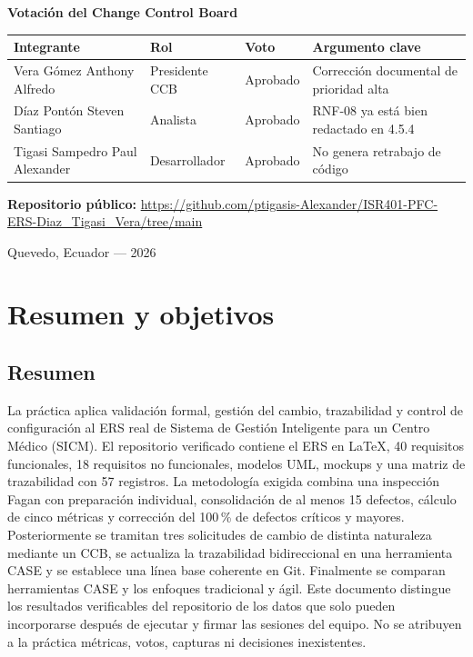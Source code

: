 \documentclass[11pt,a4paper]{article}
\newcommand{\sistema}{Sistema de Gestión Inteligente para un Centro Médico (SICM)}
\begin{document}
\begin{titlepage}
		\vspace{0.8cm}
		{\large\bfseries Votación del Change Control Board\par}
		\vspace{0.25cm}
		\begin{tabularx}{\textwidth}{p{4.2cm}p{3.2cm}p{2.0cm}X}
			\toprule
			\textbf{Integrante} & \textbf{Rol} & \textbf{Voto} & \textbf{Argumento clave} \\
			\midrule
			Vera Gómez Anthony Alfredo & Presidente CCB & Aprobado & Corrección documental de prioridad alta \\
			Díaz Pontón Steven Santiago & Analista & Aprobado & RNF-08 ya está bien redactado en 4.5.4 \\
			Tigasi Sampedro Paul Alexander & Desarrollador & Aprobado & No genera retrabajo de código \\
			\bottomrule
		\end{tabularx}
		
		\vfill
		\noindent\textbf{Repositorio público:} \url{https://github.com/ptigasis-Alexander/ISR401-PFC-ERS-Diaz_Tigasi_Vera/tree/main}
		
		\vspace{0.5cm}
		Quevedo, Ecuador --- 2026
	\end{titlepage}
	
	\tableofcontents
	\listoftables
	\listoffigures
	\clearpage
	
	\section{Resumen y objetivos}
	\subsection{Resumen}
	La práctica aplica validación formal, gestión del cambio, trazabilidad y control de configuración al ERS real de \sistema. El repositorio verificado contiene el ERS en \LaTeX, 40 requisitos funcionales, 18 requisitos no funcionales, modelos UML, mockups y una matriz de trazabilidad con 57 registros. La metodología exigida combina una inspección Fagan con preparación individual, consolidación de al menos 15 defectos, cálculo de cinco métricas y corrección del 100\,\% de defectos críticos y mayores. Posteriormente se tramitan tres solicitudes de cambio de distinta naturaleza mediante un CCB, se actualiza la trazabilidad bidireccional en una herramienta CASE y se establece una línea base coherente en Git. Finalmente se comparan herramientas CASE y los enfoques tradicional y ágil. Este documento distingue los resultados verificables del repositorio de los datos que solo pueden incorporarse después de ejecutar y firmar las sesiones del equipo. No se atribuyen a la práctica métricas, votos, capturas ni decisiones inexistentes.
	
\end{document}
